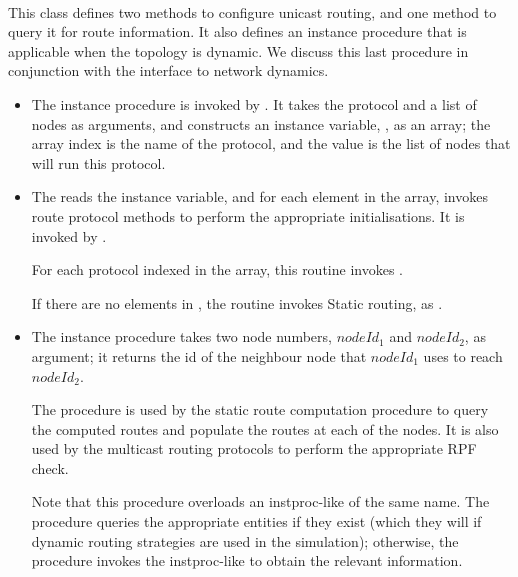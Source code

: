 \paragraph{}
This class defines two methods to configure unicast routing,
and one method to query it for route information.
It also defines an instance procedure that is applicable when
the topology is dynamic.
We discuss this last procedure in conjunction
with the interface to network dynamics.
\begin{itemize}
\item The instance procedure
is invoked by .
It takes the protocol and a list of nodes as arguments,
and constructs an instance variable, , as an array;
the array index is the name of the protocol, and the value is the list
of nodes that will run this protocol.
\item The
reads the  instance variable, and 
for each element in the array, 
invokes route protocol methods to perform the appropriate initialisations.
It is invoked by
.

For each protocol  indexed in the  array,
this routine invokes
.

If there are no elements in ,
the routine invokes Static routing, as
.

\item The instance procedure
takes two node numbers, $nodeId_1$ and $nodeId_2$, as argument;
it returns the id of the neighbour node that $nodeId_1$ uses to 
reach $nodeId_2$.

The procedure is used by the static route computation procedure to query
the computed routes and populate the routes at each of the nodes.
It is also used by the multicast routing protocols to perform the
appropriate RPF check.

Note that this procedure overloads an instproc-like of the same name.
The procedure queries the appropriate  entities
if they exist
(which they will if dynamic routing strategies are used in the simulation);
otherwise, the procedure invokes the instproc-like to obtain the relevant
information.
\end{itemize}

